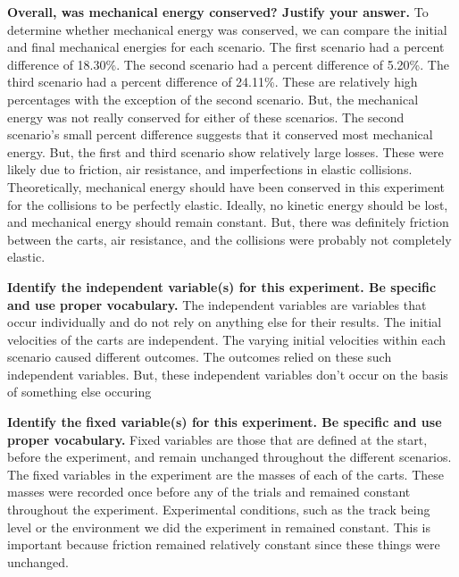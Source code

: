 \documentclass{article}
\begin{document}
\textbf{Overall, was mechanical energy conserved? Justify your answer.}\vspace{0.25cm}
\newline
To determine whether mechanical energy was conserved, we can compare the initial and final mechanical energies for each scenario. The first scenario had a percent difference of 18.30\%. The second scenario had a percent difference of 5.20\%. The third scenario had a percent difference of 24.11\%. These are relatively high percentages with the exception of the second scenario. But, the mechanical energy was not really conserved for either of these scenarios. The second scenario's small percent difference suggests that it conserved most mechanical energy. But, the first and third scenario show relatively large losses. These were likely due to friction, air resistance, and imperfections in elastic collisions. Theoretically, mechanical energy should have been conserved in this experiment for the collisions to be perfectly elastic. Ideally, no kinetic energy should be lost, and mechanical energy should remain constant. But, there was definitely friction between the carts, air resistance, and the collisions were probably not completely elastic. \vspace{0.5cm}   

\textbf{Identify the independent variable(s) for this experiment.
Be specific and use proper vocabulary.}\vspace{0.25cm}
\newline
The independent variables are variables that occur individually and do not rely on anything else for their results. The initial velocities of the carts are independent. The varying initial velocities within each scenario caused different outcomes. The outcomes relied on these such independent variables. But, these independent variables don't occur on the basis of something else occuring \vspace{0.5cm}


\textbf{Identify the fixed variable(s) for this experiment.
Be specific and use proper vocabulary.}\vspace{0.25cm}
\newline
Fixed variables are those that are defined at the start, before the experiment, and remain unchanged throughout the different scenarios.
The fixed variables in the experiment are the masses of each of the carts. These masses were recorded once before any of the trials and remained constant throughout the experiment. 
Experimental conditions, such as the track being level or the environment we did the experiment in remained constant. This is important because friction remained relatively constant since these things were unchanged.\vspace{0.5cm}
\end{document}
